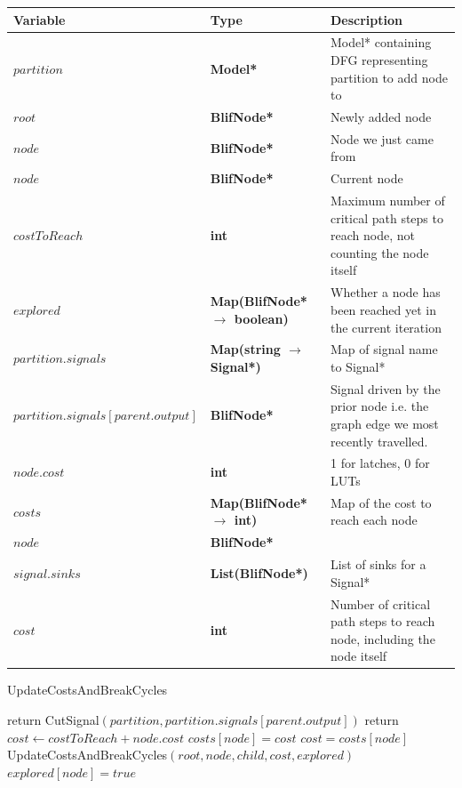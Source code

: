 \documentclass[12pt,final,oneside]{article} %
\begin{document}
\begin{algorithm}
    \begin{center}
        \begin{tabularx}{\linewidth}{llX}
        \toprule
        Variable & Type & Description\\
        \midrule
        $partition$ &\bf  Model* & Model* containing DFG representing partition to add node to\\
        $root$ &\bf  BlifNode* & Newly added node\\
        $node$ &\bf  BlifNode* & Node we just came from\\
        $node$ &\bf  BlifNode* & Current node\\
        $costToReach$ &\bf  int & Maximum number of critical path steps to reach node, not counting the node itself \\
        $explored$ &\bf  Map(BlifNode* $\to$ boolean) & Whether a node has been reached yet in the current iteration \\ 
        $partition.signals$ &\bf  Map(string $\to$ Signal*) & Map of signal name to Signal* \\
        $partition.signals[parent.output]$ &\bf  BlifNode* & Signal driven by the prior node i.e. the graph edge we most recently travelled. \\
        $node.cost$ &\bf  int & 1 for latches, 0 for LUTs \\
        $costs$ &\bf  Map(BlifNode* $\to$ int) & Map of the cost to reach each node \\
        $node$ &\bf  BlifNode* & \\
        $signal.sinks$ &\bf  List(BlifNode*) & List of sinks for a Signal* \\
        $cost$ &\bf  int & Number of critical path steps to reach node, including the node itself \\
        \bottomrule
        \end{tabularx}
    \end{center}
   \caption{UpdateCostsAndBreakCycles}\label{updatecosts}
   \begin{algorithmic}[1]
       
            \State return
         \EndIf
          
            \State CutSignal$(partition, partition.signals[parent.output])$
            \State return
         \EndIf
         \State $cost \gets costToReach+node.cost$
            \State $costs[node] = cost$
         \Else
            \State $cost = costs[node]$
         \EndIf
            \State UpdateCostsAndBreakCycles$(root, node, child, cost, explored)$
         \EndFor
         \State $explored[node] = true$
      \EndProcedure
   \end{algorithmic}
\end{algorithm}
\end{document}
